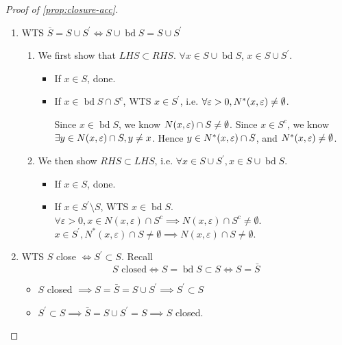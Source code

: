 \begin{proof}[Proof of \ref{prop:closure-acc}]
    \begin{enumerate}
        \item WTS $\overline{S} = S \cup S^{\prime} \iff S \cup \operatorname{bd} S = S \cup S^{\prime}$
            \begin{enumerate}
                \item We first show that $LHS \subset RHS$. 
                $\forall x \in S \cup \operatorname{bd} S$, $x \in S \cup S^{\prime}$. 
                \begin{itemize}
                    \item If $x \in S$, done. 
                    \item If $x \in \operatorname{bd} S \cap S^c$, 
                        WTS $x \in S^{\prime}$, i.e. $\forall \varepsilon > 0, N^*(x, \varepsilon) \neq \emptyset$. 
                        \medskip 

                        Since $x \in \operatorname{bd} S$, we know $N(x, \varepsilon) \cap S \neq \emptyset$. 
                        Since $x \in S^c$, we know $\exists y \in N(x, \varepsilon)\cap S, y \neq x$. 
                        Hence $y \in N^*(x, \varepsilon) \cap S$, 
                        and $N^*(x, \varepsilon) \neq \emptyset$.
                \end{itemize} 
                \item We then show $RHS \subset LHS$, i.e. 
                $\forall x \in S \cup S^{\prime}, x \in S \cup \operatorname{bd} S$. 
                \begin{itemize}
                    \item If $x \in S$, done. 
                    \item If $x \in S^{\prime} \setminus S$,
                WTS $x \in \operatorname{bd} S$. 
                $\forall \varepsilon > 0, x \in N(x, \varepsilon) \cap S^c \implies N(x, \varepsilon) \cap S^c \neq \emptyset$.
                $x \in S^{\prime}, N^*(x, \varepsilon) \cap S \neq \emptyset \implies N(x, \varepsilon) \cap S \neq \emptyset$.
                \end{itemize} 
            \end{enumerate}
        \item WTS $S$ close $\iff S^{\prime} \subset S$. Recall 
            \[
                S \text{ closed} 
                \iff S = \operatorname{bd} S \subset S
                \iff S = \bar{S} 
            \]
            \begin{itemize}
                \item $S$ closed $\implies S = \bar{S} = S \cup S^{\prime} \implies S^{\prime} \subset S$ 
                \item $S^{\prime} \subset S \implies \bar{S} = S \cup S^{\prime} = S \implies S $ closed.
            \end{itemize} 
    \end{enumerate}
\end{proof}

